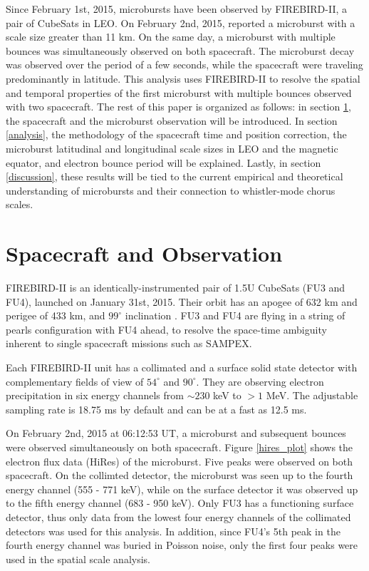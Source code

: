 \documentclass[draft,linenumbers]{agujournal}
\begin{document}
Since February 1st, 2015, microbursts have been observed by FIREBIRD-II, a pair of CubeSats in LEO. On February 2nd, 2015, \citet{Crew2016} reported a microburst with a scale size greater than 11 km. On the same day, a microburst with multiple bounces was simultaneously observed on both spacecraft. The microburst decay was observed over the period of a few seconds, while the spacecraft were traveling predominantly in latitude. This analysis uses FIREBIRD-II to resolve the spatial and temporal properties of the first microburst with multiple bounces observed with two spacecraft. The rest of this paper is organized as follows: in section \ref{obs}, the spacecraft and the microburst observation will be introduced. In section \ref{analysis}, the methodology of the spacecraft time and position correction, the microburst latitudinal and longitudinal scale sizes in LEO and the magnetic equator, and electron bounce period will be explained. Lastly, in section \ref{discussion}, these results will be tied to the current empirical and theoretical understanding of microbursts and their connection to whistler-mode chorus scales.

\section{Spacecraft and Observation} \label{obs} %
FIREBIRD-II is an identically-instrumented pair of 1.5U CubeSats (FU3 and FU4), launched on January 31st, 2015. Their orbit has an apogee of 632 km and perigee of 433 km, and $99^{\circ}$ inclination \citep{Crew2016}. FU3 and FU4 are flying in a string of pearls configuration with FU4 ahead, to resolve the space-time ambiguity inherent to single spacecraft missions such as SAMPEX.

Each FIREBIRD-II unit has a collimated and a surface solid state detector with complementary fields of view of $54^{\circ}$ and $90^{\circ}$. They are observing electron precipitation in six energy channels from $\sim 230$ keV to $> 1$ MeV. The adjustable sampling rate is 18.75 ms by default and can be at a fast as 12.5 ms. 

On February 2nd, 2015 at 06:12:53 UT, a microburst and subsequent bounces were observed simultaneously on both spacecraft. Figure \ref{hires_plot} shows the electron flux data (HiRes) of the microburst. Five peaks were observed on both spacecraft. On the collimted detector, the microburst was seen up to the fourth energy channel (555 - 771 keV), while on the surface detector it was observed up to the fifth energy channel (683 - 950 keV). Only FU3 has a functioning surface detector, thus only data from the lowest four energy channels of the collimated detectors was used for this analysis. In addition, since FU4's 5th peak in the fourth energy channel was buried in Poisson noise, only the first four peaks were used in the spatial scale analysis.
\end{document}
